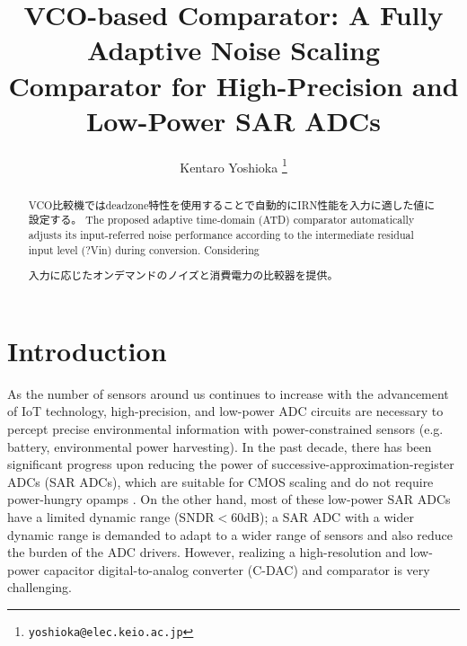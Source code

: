 \documentclass[letterpaper, 10 pt, conference]{ieeeconf}  %
\title{\LARGE \bf
VCO-based Comparator: A Fully Adaptive Noise Scaling Comparator for High-Precision and Low-Power SAR ADCs
}
\author{Kentaro Yoshioka%
\thanks{
        {\tt\small yoshioka@elec.keio.ac.jp}}
}
\begin{document}
\maketitle
\thispagestyle{empty}
\pagestyle{empty}

\begin{abstract}
VCO比較機ではdeadzone特性を使用することで自動的にIRN性能を入力に適した値に設定する。
The proposed adaptive time-domain (ATD) comparator automatically adjusts its input-referred noise performance according to the intermediate residual input level (?Vin) during conversion. Considering

入力に応じたオンデマンドのノイズと消費電力の比較器を提供。


\end{abstract}

\section{Introduction}
As the number of sensors around us continues to increase with the advancement of IoT technology, high-precision, and low-power ADC circuits are necessary to percept precise environmental information with power-constrained sensors (e.g. battery, environmental power harvesting). In the past decade, there has been significant progress upon reducing the power of successive-approximation-register ADCs (SAR ADCs), which are suitable for CMOS scaling and do not require power-hungry opamps \cite{van201010,shikata20120,yoshioka201010,yoshioka20148,zhu201010,tai201411}. On the other hand, most of these low-power SAR ADCs have a limited dynamic range (SNDR$<$60dB); a SAR ADC with a wider dynamic range is demanded to adapt to a wider range of sensors and also reduce the burden of the ADC drivers. However, realizing a high-resolution and low-power capacitor digital-to-analog converter (C-DAC) and comparator is very challenging.

\end{document}
